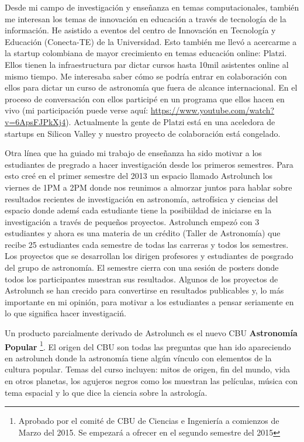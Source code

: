 \documentclass[letterpaper,12pt,onecolumn]{article}
\begin{document}
Desde mi campo de investigaci\'on y ense\~nanza en temas
computacionales, tambi\'en me interesan los temas de innovaci\'on en
educaci\'on a trav\'es de tecnolog\'ia de la informaci\'on. He
asistido a eventos del centro de Innovaci\'on en Tecnolog\'ia y
Educaci\'on (Conecta-TE) de la Universidad. Esto tambi\'en me llev\'o
a acercarme a la startup colombiana de mayor crecimiento en temas
educaci\'on online: Platzi. Ellos tienen la infraestructura par dictar
cursos hasta 10mil asistentes online al mismo tiempo. Me interesaba
saber c\'omo se podr\'ia entrar en colaboraci\'on con ellos para
dictar un curso de astronom\'ia que fuera de alcance internacional. En
el proceso de conversaci\'on con ellos particip\'e en un programa que
ellos hacen en vivo (mi participaci\'on puede verse aqu\'i:
\url{https://www.youtube.com/watch?v=6ApsFJPkXj4}). Actualmente la
gente de Platzi est\'a en una aceledora de startups en Silicon Valley
y nuestro proyecto de colaboraci\'on est\'a congelado.

Otra l\'inea que ha guiado mi trabajo de ense\~nanza ha sido motivar a los estudiantes de pregrado a hacer investigaci\'on desde los primeros semestres. Para
esto cre\'e en el primer semestre del 2013 un espacio llamado Astrolunch
los viernes de 1PM a 2PM donde nos reunimos a almorzar juntos para hablar
sobre resultados recientes de investigaci\'on en astronom\'ia,
astrof\'isica y ciencias del espacio donde adem\'s cada
estudiante tiene la posibiildad de iniciarse en la investigaci\'on a
trav\'es de peque\~nos proyectos. Astrolunch empez\'o con 3 estudiantes y
ahora es una materia de un cr\'edito (Taller de Astronom\'ia) que recibe
25 estudiantes cada semestre de todas las carreras y todos los
semestres. Los proyectos que se desarrollan los dirigen profesores y
estudiantes de posgrado del grupo de astronom\'ia. El semestre cierra
con una sesi\'on de posters donde todos los participantes muestran sus
resultados. Algunos de los proyectos de Astrolunch se han crecido para
convertirse en resultados publicables y, lo m\'as importante en mi
opini\'on, para motivar a los estudiantes a pensar seriamente en lo
que significa hacer investigaci\' n. 


Un producto parcialmente derivado de Astrolunch es el nuevo CBU {\bf
  Astronom\'ia Popular} \footnote{Aprobado por el comit\'e de CBU de Ciencias e
  Ingenier\'ia a comienzos de Marzo del 2015. Se empezar\'a a ofrecer
  en el segundo semestre del 2015}. El origen del CBU son todas las
preguntas que han ido apareciendo en astrolunch donde la astronom\'ia
tiene alg\'un v\'inculo con elementos de la cultura popular. Temas del
curso incluyen: mitos de origen, fin del mundo, vida en otros planetas,
los agujeros negros como los muestran las pel\'iculas, m\'usica con tema
espacial y lo que dice la ciencia sobre la astrolog\'ia.
\end{document}
